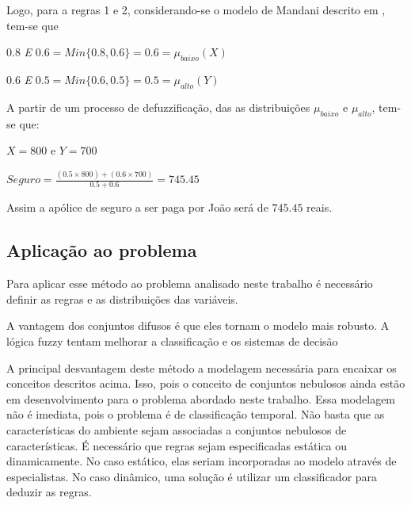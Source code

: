 Logo, para a regras 1 e 2, considerando-se o modelo de Mandani descrito em \cite{passos2005datamining}, tem-se que 
\begin{description}
  \item $0.8$ \emph{E} $0.6 = Min \lbrace 0.8,0.6 \rbrace = 0.6 = \mu_{baixo}(X)$ 
  \item $0.6$ \emph{E} $0.5 = Min \lbrace 0.6,0.5 \rbrace = 0.5 = \mu_{alto}(Y)$
\end{description}

A partir de um processo de defuzzificação, das as distribuições $\mu_{baixo}$
e $\mu_{alto}$, tem-se que:

\begin{description}
  \item $X = 800$ e $Y=700$
  \item $Seguro = \frac{(0.5 \times 800)+(0.6 \times 700)}{0.5 + 0.6} = 745.45$
\end{description}

Assim a apólice de seguro a ser paga por João será de $745.45$ reais.

\subsection{Aplicação ao problema}

Para aplicar esse método ao problema analisado neste trabalho é necessário definir as regras e as distribuições
das variáveis.

A vantagem dos conjuntos difusos é que eles tornam o modelo mais robusto. A lógica fuzzy
tentam melhorar a classificação e os sistemas de decisão 

A principal desvantagem deste método a modelagem necessária para encaixar os conceitos descritos acima.
Isso, pois o conceito de conjuntos nebulosos ainda estão em desenvolvimento para o problema abordado
neste trabalho. Essa modelagem não é imediata, pois o problema é de classificação temporal. Não basta que
as características do ambiente sejam associadas a conjuntos nebulosos de características. É necessário
que regras sejam especificadas estática ou dinamicamente. No caso estático, elas seriam incorporadas
ao modelo através de especialistas. No caso dinâmico, uma solução é utilizar um classificador para
deduzir as regras.
